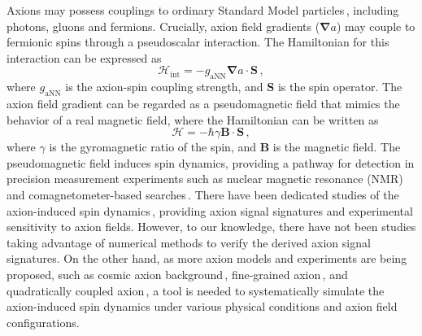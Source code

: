 \documentclass[%
 reprint,
nofootinbib,
 amsmath,amssymb,
 aps,
]{revtex4-2}
\begin{document}
Axions may possess couplings to ordinary Standard Model particles\,\cite{Graham2013_Newobservables}, including photons, gluons and fermions. 
Crucially, axion field gradients ($\mathbf{\nabla}a$) may couple to fermionic spins through a pseudoscalar interaction. The Hamiltonian for this interaction can be expressed as
\begin{equation}
    \mathcal{H}_{\mathrm{int}} = - g_\mathrm{aNN} \mathbf{\nabla}a \cdot \mathbf{S}\,,
\end{equation}
where $g_\mathrm{aNN}$ is the axion-spin coupling strength, and $\mathbf{S}$ is the spin operator. 
The axion field gradient can be regarded as a pseudomagnetic field that mimics the behavior of a real magnetic field, where the Hamiltonian can be written as
\begin{equation}
    \mathcal{H} = -\hbar \gamma \mathbf{B} \cdot \mathbf{S} \,,
\end{equation} 
where $\gamma$ is the gyromagnetic ratio of the spin, and $\mathbf{B}$ is the magnetic field. 
The pseudomagnetic field induces spin dynamics, providing a pathway for detection in precision measurement experiments such as nuclear magnetic resonance (NMR) and comagnetometer-based searches\,\cite{ouellet2019first, du2018search, ALPHA2023,aja2022canfranc,CAPP2024,brouwer2022projected,alesini2023future,ZhongL2018results,garcia2024searchaxiondarkmatter,Quiskamp2024_ORGAN,rettaroli2024search,Gramolin2021_Ferromagnetic,gavilan2024searching,bloch2105nasduck,abel2023_HgDM,karanth2023first,LeeJunyi2023_NeutronSpin,capozzi2023new, CASPErProposal2014, kimball2018overview, wang2018application, aybas2021_SolidStateNMR, CASPEr_ZULF_2019,Walter2025_CASPErG}. 
There have been dedicated studies of the axion-induced spin dynamics\,\cite{Aybas_2021_Quantum_sensitivity, Dror2023_SensitivityAxion, Yuzhe2023_FrequencyScanning}, providing axion signal signatures and experimental sensitivity to axion fields. 
However, to our knowledge, there have not been studies taking advantage of numerical methods to verify the derived axion signal signatures. 
On the other hand, as more axion models and experiments are being proposed, such as cosmic axion background\,\cite{Dror2021_CosmicAxionBackground,Nitta2023_ADMX_CosmicAxionBackground}, fine-grained axion\,\cite{OHare2025_Finegrained}, and quadratically coupled axion\,\cite{GanXucheng2026_quadraticPTA, huang2026earthmatterenhancedaxion}, a tool is needed to systematically simulate the axion-induced spin dynamics under various physical conditions and axion field configurations.
\end{document}
